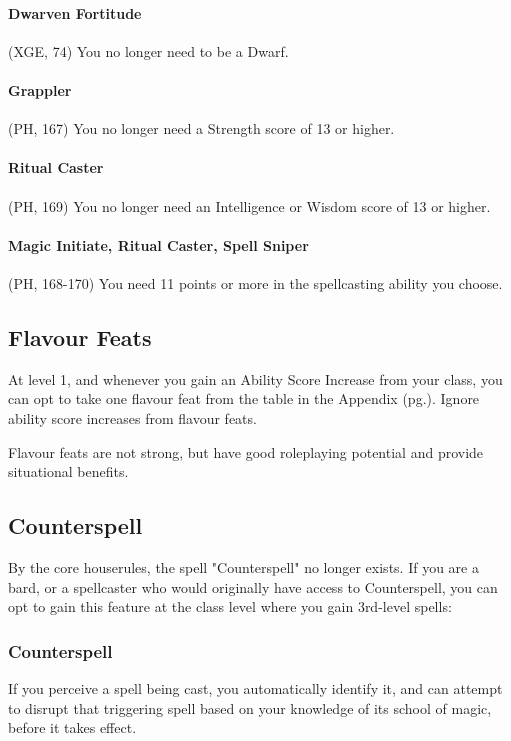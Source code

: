 \documentclass[letterpaper,twocolumn,openany,nodeprecatedcode]{dndbook}
\newcommand{\pg}[1]{pg.\pageref{#1}}
\begin{document}
\paragraph{Dwarven Fortitude} (XGE, 74) You no longer need to be a Dwarf.

\paragraph{Grappler} (PH, 167) You no longer need a Strength score of 13 or higher.

\paragraph{Ritual Caster} (PH, 169) You no longer need an Intelligence or Wisdom score of 13 or higher.

\paragraph{Magic Initiate, Ritual Caster, Spell Sniper} (PH, 168-170) You need 11 points or more in the spellcasting ability you choose.

\label{flavour-feats}
\subsection{Flavour Feats}
At level 1, and whenever you gain an Ability Score Increase from your class, you can opt to take one flavour feat from the table in the Appendix (\pg{flavour-feats-table}). Ignore ability score increases from flavour feats.

Flavour feats are not strong, but have good roleplaying potential and provide situational benefits.

\label{counterspell}
\subsection{Counterspell}
By the core houserules, the spell "Counterspell" no longer exists. If you are a bard, or a spellcaster who would originally have access to Counterspell, you can opt to gain this feature at the class level where you gain 3rd-level spells:

\subsubsection{Counterspell}
If you perceive a spell being cast, you automatically identify it, and can attempt to disrupt that triggering spell based on your knowledge of its school of magic, before it takes effect.
\end{document}
